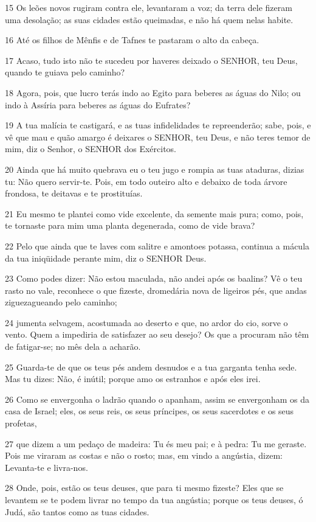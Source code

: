 \par 15 Os leões novos rugiram contra ele, levantaram a voz; da terra dele fizeram uma desolação; as suas cidades estão queimadas, e não há quem nelas habite.
\par 16 Até os filhos de Mênfis e de Tafnes te pastaram o alto da cabeça.
\par 17 Acaso, tudo isto não te sucedeu por haveres deixado o SENHOR, teu Deus, quando te guiava pelo caminho?
\par 18 Agora, pois, que lucro terás indo ao Egito para beberes as águas do Nilo; ou indo à Assíria para beberes as águas do Eufrates?
\par 19 A tua malícia te castigará, e as tuas infidelidades te repreenderão; sabe, pois, e vê que mau e quão amargo é deixares o SENHOR, teu Deus, e não teres temor de mim, diz o Senhor, o SENHOR dos Exércitos.
\par 20 Ainda que há muito quebrava eu o teu jugo e rompia as tuas ataduras, dizias tu: Não quero servir-te. Pois, em todo outeiro alto e debaixo de toda árvore frondosa, te deitavas e te prostituías.
\par 21 Eu mesmo te plantei como vide excelente, da semente mais pura; como, pois, te tornaste para mim uma planta degenerada, como de vide brava?
\par 22 Pelo que ainda que te laves com salitre e amontoes potassa, continua a mácula da tua iniqüidade perante mim, diz o SENHOR Deus.
\par 23 Como podes dizer: Não estou maculada, não andei após os baalins? Vê o teu rasto no vale, reconhece o que fizeste, dromedária nova de ligeiros pés, que andas ziguezagueando pelo caminho;
\par 24 jumenta selvagem, acostumada ao deserto e que, no ardor do cio, sorve o vento. Quem a impediria de satisfazer ao seu desejo? Os que a procuram não têm de fatigar-se; no mês dela a acharão.
\par 25 Guarda-te de que os teus pés andem desnudos e a tua garganta tenha sede. Mas tu dizes: Não, é inútil; porque amo os estranhos e após eles irei.
\par 26 Como se envergonha o ladrão quando o apanham, assim se envergonham os da casa de Israel; eles, os seus reis, os seus príncipes, os seus sacerdotes e os seus profetas,
\par 27 que dizem a um pedaço de madeira: Tu és meu pai; e à pedra: Tu me geraste. Pois me viraram as costas e não o rosto; mas, em vindo a angústia, dizem: Levanta-te e livra-nos.
\par 28 Onde, pois, estão os teus deuses, que para ti mesmo fizeste? Eles que se levantem se te podem livrar no tempo da tua angústia; porque os teus deuses, ó Judá, são tantos como as tuas cidades.
